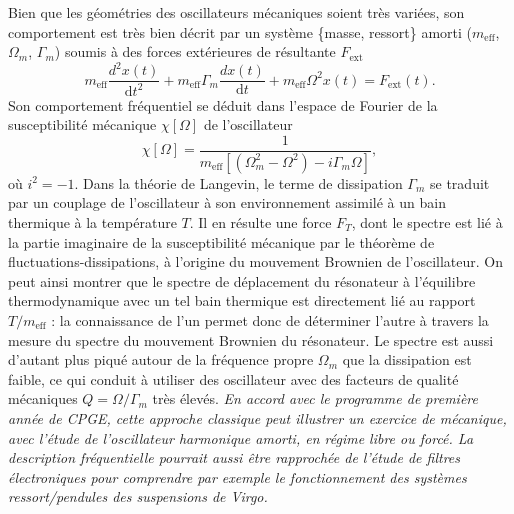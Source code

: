 \documentclass[12pt,a4paper]{article}
\renewcommand{\d}{\mathrm{d}}
\begin{document}
Bien que les géométries des oscillateurs mécaniques soient très variées, son comportement est très bien décrit par un système \{masse, ressort\} amorti ($m_\mathrm{eff}$, $\Omega_m$, $\Gamma_m$) soumis à des forces extérieures de résultante $F_\mathrm{ext}$
\begin{equation}
m_\mathrm{eff} \frac{d^2 x(t)}{\d t^2} + m_\mathrm{eff}\Gamma_m \frac{d x(t)}{\d t} + m_\mathrm{eff} \Omega^2 x(t) = F_\mathrm{ext}(t).
\end{equation}
Son comportement fréquentiel se déduit dans l'espace de Fourier de la susceptibilité mécanique $\chi[\Omega]$ de l'oscillateur 
\begin{equation}
\chi[\Omega] = \frac{1}{m_\mathrm{eff}[(\Omega_m^2-\Omega^2)-i\Gamma_m\Omega]},
\end{equation}
où $i^2=-1$. 
Dans la théorie de Langevin, le terme de dissipation $\Gamma_m$ se traduit par un couplage de l'oscillateur à son environnement assimilé à un bain thermique à la température $T$.
Il en résulte une force $F_T$, dont le spectre est lié à la partie imaginaire de la susceptibilité mécanique par le théorème de fluctuations-dissipations, à l'origine du mouvement Brownien de l'oscillateur.
On peut ainsi montrer que le spectre de déplacement du résonateur à l'équilibre thermodynamique avec un tel bain thermique est directement lié au rapport $T/m_\mathrm{eff}$ : la connaissance de l'un permet donc de déterminer l'autre à travers la mesure du spectre du mouvement Brownien du résonateur.
Le spectre est aussi d'autant plus piqué autour de la fréquence propre $\Omega_m$ que la dissipation est faible, ce qui conduit à utiliser des oscillateur avec des facteurs de qualité mécaniques $Q=\Omega/\Gamma_m$ très élevés.
\emph{En accord avec le programme de première année de CPGE, cette approche classique peut illustrer un exercice de mécanique, avec l'étude de l'oscillateur harmonique amorti, en régime libre ou forcé.
La description fréquentielle pourrait aussi être rapprochée de l'étude de filtres électroniques pour comprendre par exemple le fonctionnement des systèmes ressort/pendules des suspensions de Virgo.}
\end{document}

